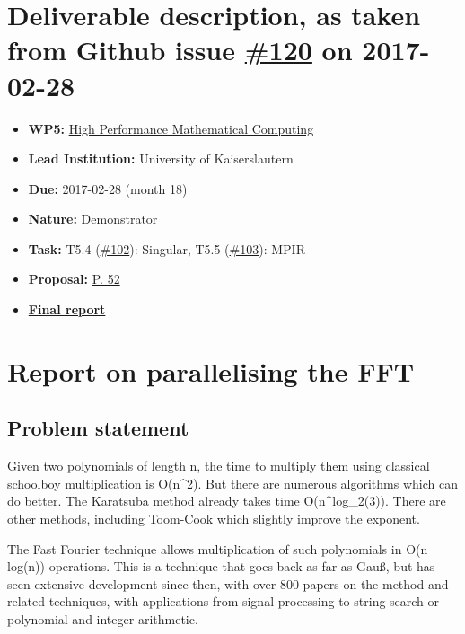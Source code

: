 \section*{\texorpdfstring{Deliverable description, as taken from Github
issue
\href{https://github.com/OpenDreamKit/OpenDreamKit/issues/120}{\#120} on
2017-02-28}{Deliverable description, as taken from Github issue \#120 on 2017-02-28}}\label{deliverable-description-as-taken-from-github-issue-120-on-2017-02-28}

\begin{itemize}
\tightlist
\item
  \textbf{WP5:}
  \href{https://github.com/OpenDreamKit/OpenDreamKit/tree/master/WP5}{High
  Performance Mathematical Computing}
\item
  \textbf{Lead Institution:} University of Kaiserslautern
\item
  \textbf{Due:} 2017-02-28 (month 18)
\item
  \textbf{Nature:} Demonstrator
\item
  \textbf{Task:} T5.4
  (\href{https://github.com/OpenDreamKit/OpenDreamKit/issues/102}{\#102}):
  Singular, T5.5
  (\href{https://github.com/OpenDreamKit/OpenDreamKit/issues/103}{\#103}):
  MPIR
\item
  \textbf{Proposal:}
  \href{https://github.com/OpenDreamKit/OpenDreamKit/raw/master/Proposal/proposal-www.pdf}{P.
  52}
\item
  \textbf{\href{https://github.com/OpenDreamKit/OpenDreamKit/raw/master/WP5/D5.7/report-final.pdf}{Final
  report}}
\end{itemize}

\section{Report on parallelising the
FFT}\label{report-on-parallelising-the-fft}

\subsection{Problem statement}\label{problem-statement}

Given two polynomials of length n, the time to multiply them using
classical schoolboy multiplication is O(n\^{}2). But there are numerous
algorithms which can do better. The Karatsuba method already takes time
O(n\^{}log\_2(3)). There are other methods, including Toom-Cook which
slightly improve the exponent.

The Fast Fourier technique allows multiplication of such polynomials in
O(n log(n)) operations. This is a technique that goes back as far as
Gauß, but has seen extensive development since then, with over 800
papers on the method and related techniques, with applications from
signal processing to string search or polynomial and integer arithmetic.

